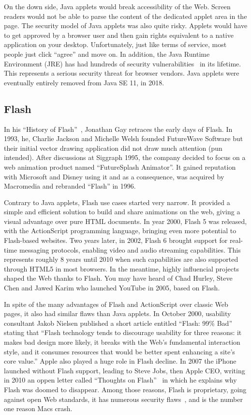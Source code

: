 On the down side, Java applets would break accessibility of the Web.
Screen readers would not be able to parse the content of the dedicated
applet area in the page.
The security model of Java applets was also quite risky.
Applets would have to get approved by a browser user and then gain rights
equivalent to a native application on your desktop.
Unfortunately, just like terms of service, most people just click ``agree''
and move on.
In addition, the Java Runtime Environment (JRE) has had hundreds of security
vulnerabilities~\cite{JreCve} in its lifetime.
This represents a serious security threat for browser vendors.
Java applets were eventually entirely removed from Java SE 11, in 2018.

\subsection{Flash}%
\label{sub:Flash}

In his ``History of Flash''~\cite{HistoryFlash}, Jonathan Gay retraces the early days of Flash.
In 1993, he, Charlie Jackson and Michelle Welsh founded FutureWave Software
but their initial vector drawing application did not draw much attention (pun intended).
After discussions at Siggraph 1995, the company decided to focus on a web animation
product named ``FutureSplash Animator''.
It gained reputation with Microsoft and Disney using it and as a consequence,
was acquired by Macromedia and rebranded ``Flash'' in 1996.

Contrary to Java applets, Flash use cases started very narrow.
It provided a simple and efficient solution to build and share animations on the web,
giving a visual advantage over pure HTML documents.
In year 2000, Flash 5 was released, with the ActionScript programming language,
bringing even more potential to Flash-based websites.
Two years later, in 2002, Flash 6 brought support for real-time messaging protocols,
enabling video and audio streaming capabilities.
This represents roughly 8 years until 2010 when such capabilities are also
supported through HTML5 in most browsers.
In the meantime, highly influencial projects shaped the Web thanks to Flash.
You may have heard of Chad Hurley, Steve Chen and Jawed Karim who launched
YouTube in 2005, based on Flash.

In spite of the many advantages of Flash and ActionScript over classic Web pages,
it also had similar flaws than Java applets.
In October 2000, usability consultant Jakob Nielsen published a short article
entitled ``Flash: 99\% Bad''~\cite{FlashBadNielsen} stating that
``Flash technology tends to discourage usability for three reasons:
it makes bad design more likely,
it breaks with the Web's fundamental interaction style,
and it consumes resources that would be better spent enhancing a site's core value.''
Apple also played a huge role in Flash decline.
In 2007 the iPhone launched without Flash support,
leading to Steve Jobs, then Apple CEO, writing in 2010 an oppen letter called
``Thoughts on Flash''~\cite{FlashJobs}
in which he explains why Flash was doomed to disappear.
Among those reasons, Flash is proprietary, going against open Web standards,
it has numerous security flaws~\cite{FlashCVE}, and is the number one reason Macs crash.

